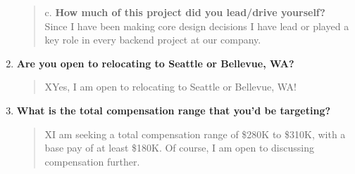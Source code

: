 \begin{cvparagraph}
\begin{enumerate}
\begin{quote}
          c. \textbf{How much of this project did you lead/drive yourself?} \\
          Since I have been making core design decisions I have lead or played a key role in every backend project at our company.

      \end{quote}
      \item \textbf{Are you open to relocating to Seattle or Bellevue, WA?} \\
      \begin{quote}
          XYes, I am open to relocating to Seattle or Bellevue, WA!
      \end{quote}
      \item \textbf{What is the total compensation range that you'd be targeting?} \\
      \begin{quote}
          XI am seeking a total compensation range of \$280K to \$310K, with a base pay of at least \$180K.
          Of course, I am open to discussing compensation further.

      \end{quote}
    \end{enumerate}
\end{cvparagraph}
